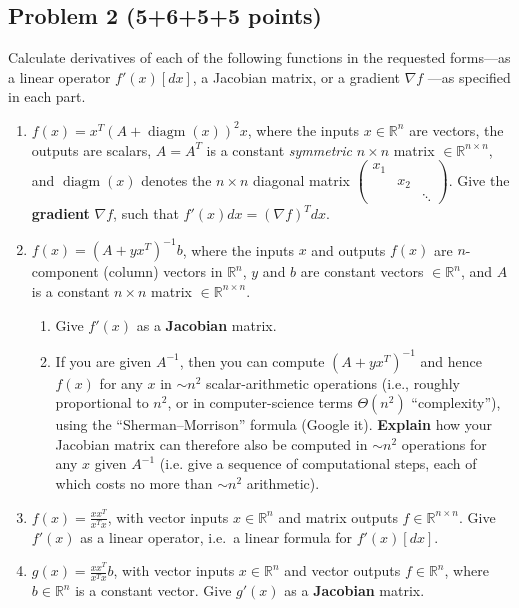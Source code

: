 \documentclass{article}
\newcommand{\diagm}{\operatorname{diagm}}
\begin{document}
\subsection*{Problem 2 (5+6+5+5 points)}


Calculate derivatives of each of the following functions in the requested forms---as a linear operator $f'(x)[dx]$, a Jacobian matrix, or a gradient $\nabla f$ ---as specified in each part.

\begin{enumerate}[label=(\alph*)]

\item $f(x) = x^T (A + \diagm(x))^2 x$, where the inputs $x \in \mathbb{R}^n$ are vectors, the outputs are scalars, $A = A^T$ is a constant \emph{symmetric} $n\times n$ matrix $\in \mathbb{R}^{n\times n}$, and $\diagm(x)$ denotes the  $n\times n$  diagonal matrix $\begin{pmatrix} x_1 & & \\ & x_2 & \\ & & \ddots \end{pmatrix}$.  Give the \textbf{gradient} $\nabla f$, such that $f'(x)dx = (\nabla f)^T dx$.

\item $f(x) = (A + yx^T)^{-1} b$, where the inputs $x$ and outputs $f(x)$ are $n$-component (column) vectors in $\mathbb{R}^n$, $y$ and $b$ are constant vectors $\in \mathbb{R}^n$, and $A$ is a constant $n\times n$ matrix $\in \mathbb{R}^{n\times n}$.   

\begin{enumerate}[label=(\roman*)]
\item Give $f'(x)$ as a \textbf{Jacobian} matrix.
\item If you are given $A^{-1}$, then you can compute $(A + yx^T)^{-1}$ and hence $f(x)$ for any $x$ in $\sim n^2$ scalar-arithmetic operations (i.e., roughly proportional to $n^2$, or in computer-science terms $\Theta(n^2)$ ``complexity''), using the ``Sherman--Morrison'' formula (Google it).  \textbf{Explain} how your Jacobian matrix can therefore also be computed in $\sim n^2$ operations for any $x$ given $A^{-1}$ (i.e. give a sequence of computational steps, each of which costs no more than $\sim n^2$ arithmetic).

\end{enumerate}

\item $f(x) = \frac{xx^T}{x^T x}$, with vector inputs $x \in \mathbb{R}^n$ and matrix outputs $f\in \mathbb{R}^{n\times n}$.   Give $f'(x)$ as a linear operator, i.e.~a linear formula for $f'(x)[dx]$.

\item $g(x) = \frac{xx^T}{x^T x} b$, with vector inputs $x \in \mathbb{R}^n$ and vector outputs $f\in \mathbb{R}^n$, where $b \in \mathbb{R}^n$ is a constant vector.   Give $g'(x)$ as a \textbf{Jacobian} matrix.

\end{enumerate}
\end{document}
